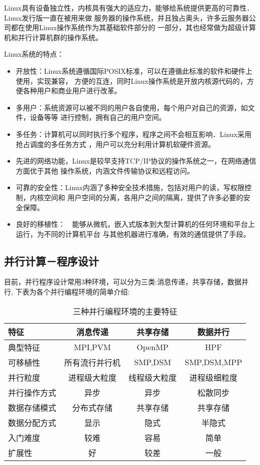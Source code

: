     Linux具有设备独立性，内核具有强大的适应力，能够给系统提供更高的可靠性．Linux发行版一直在被用来做
服务器的操作系统，并且独占奥头，许多云服务器公司都在使用Linux操作系统作为其基础软件部分的
一部分，其也经常做为超级计算机和并行计算机群的操作系统。
    
    Linux系统的特点：
    \begin{itemize}
    \item 开放性：Linux系统遵循国际POSIX标准，可以在遵循此标准的软件和硬件上使用，实现兼容，
方便的互连，同时Linux操作系统是开放内核源代码的，方便各种用户和商业用户进行改革。
    \item 多用户：系统资源可以被不同的用户各自使用，每个用户对自己的资源，如文件，设备等等
进行控制，拥有自己的用户空间。    
    \item 多任务：计算机可以同时执行多个程序，程序之间不会相互影响．Linux采用抢占调度的多任务方式
，用户可以充分利用计算机软硬件资源。
    \item 先进的网络功能，Linux是较早支持TCP/IP协议的操作系统之一，在网络通信方面优于其他
操作系统，内涵文件传输协议和远程访问。
    \item 可靠的安全性：Linux内涵了多种安全技术措施，包括对用户的读，写权限控制，内核空间和
用户空间的分离，各用户之间的隔离，提供了许多必要的安全保障。
    \item 良好的移植性：　能够从微机，嵌入式版本到大型计算机的任何环境和平台上运行，为不同的计算机平台
与其他机器进行准确，有效的通信提供了手段。
    \end{itemize}
\subsection{并行计算－程序设计}
    目前，并行程序设计常用3种环境，可以分为三类:消息传递，共享存储，数据并行,
下表为各个并行编程环境的简单介绍:

    \begin{table}[htbp]
    \centering  %
    \begin{tabular}{lccc}  %
    \hline
    特征&消息传递&共享存储&数据并行\\ \hline 
    典型特征&MPI,PVM&OpenMP&HPF\\        
    可移植性&所有流行并行机&SMP,DSM&SMP,DSM,MPP\\      
    并行粒度&进程级大粒度&线程级大粒度&进程级细粒度\\     
    并行操作方式&异步&异步&松散同步\\   
    数据存储模式&分布式存储&共享存储&共享存储\\
    数据分配方式&显示&隐式&半隐式\\
    入门难度&较难&容易&简单　\\
    扩展性&好&较差&一般\\ \hline
    \end{tabular}
    \caption{三种并行编程环境的主要特征}
    \end{table}

